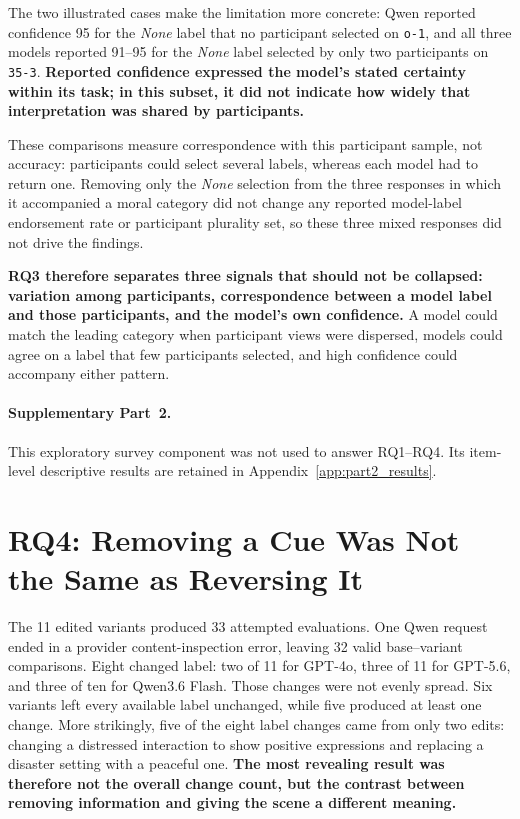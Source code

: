 The two illustrated cases make the limitation more concrete: Qwen reported
confidence 95 for the \textit{None} label that no participant selected on
\texttt{o-1}, and all three models reported 91--95 for the \textit{None} label
selected by only two participants on \texttt{35-3}. \textbf{Reported confidence
expressed the model's stated certainty within its task; in this subset, it did
not indicate how widely that interpretation was shared by participants.}

These comparisons measure correspondence with this participant sample, not
accuracy: participants could select several labels, whereas each model had to
return one. Removing only the \textit{None} selection from the three responses
in which it accompanied a moral category did not change any reported
model-label endorsement rate or participant plurality set, so these three
mixed responses did not drive the findings.

\textbf{RQ3 therefore separates three signals that should not be collapsed:
variation among participants, correspondence between a model label and those
participants, and the model's own confidence.} A model could match the leading
category when participant views were dispersed, models could agree on a label
that few participants selected, and high confidence could accompany either
pattern.

\paragraph{Supplementary Part~2.}
This exploratory survey component was not used to answer RQ1--RQ4. Its
item-level descriptive results are retained in
Appendix~\ref{app:part2_results}.


\FloatBarrier
\section{RQ4: Removing a Cue Was Not the Same as Reversing It}
\label{sec:rq4_results}

The 11 edited variants produced 33 attempted evaluations. One Qwen request
ended in a provider content-inspection error, leaving 32 valid base--variant
comparisons. Eight changed label: two of 11 for GPT-4o, three of 11 for
GPT-5.6, and three of ten for Qwen3.6 Flash. Those changes were not evenly
spread. Six variants left every available label unchanged, while five produced
at least one change. More strikingly, five of the eight label changes came from
only two edits: changing a distressed interaction to show positive expressions
and replacing a disaster setting with a peaceful one. \textbf{The most
revealing result was therefore not the overall change count, but the contrast
between removing information and giving the scene a different meaning.}

